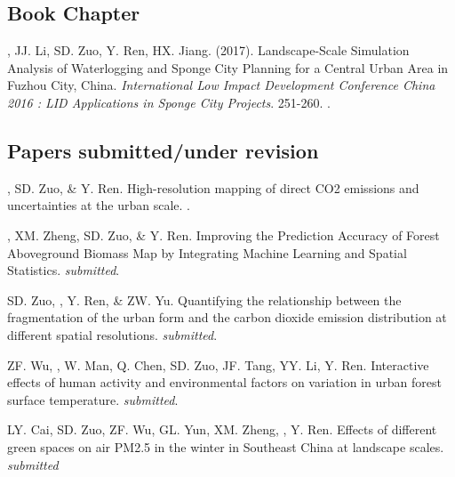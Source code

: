 \subsection*{Book Chapter}
\begin{etaremune}
\item
    \Shaoqing, JJ. Li, SD. Zuo, Y. Ren, HX. Jiang. (2017).
	Landscape-Scale Simulation Analysis of Waterlogging and Sponge City Planning for a Central Urban Area in Fuzhou City, China.
    \textit{International Low Impact Development Conference China 2016 : LID Applications in Sponge City Projects}. 251-260.
    .
\end{etaremune}

\subsection*{Papers submitted/under revision}
\begin{etaremune}
\item
    \Shaoqing, SD. Zuo, \& Y. Ren.
    High-resolution mapping of direct CO2 emissions and uncertainties at the urban scale. 
    \Review.
\item
    \Shaoqing\CF, XM. Zheng, SD. Zuo, \& Y. Ren.
    Improving the Prediction Accuracy of Forest Aboveground Biomass Map by Integrating Machine Learning and Spatial Statistics. 
    \textit{submitted}.
\item
    SD. Zuo, \Shaoqing, Y. Ren, \&  ZW. Yu.
    Quantifying the relationship between the fragmentation of the urban form and the carbon dioxide emission distribution at different spatial resolutions. 
    \textit{submitted}.
\item
    ZF. Wu, \Shaoqing, W. Man, Q. Chen, SD. Zuo, JF. Tang, YY. Li, Y. Ren.
    Interactive effects of human activity and environmental factors on variation in urban forest surface temperature. 
    \textit{submitted}.
\item
    LY. Cai, SD. Zuo, ZF. Wu, GL. Yun, XM. Zheng, \Shaoqing, Y. Ren.
    Effects of different green spaces on air PM2.5 in the winter in Southeast China at landscape scales.
    \textit{submitted}
\end{etaremune}
